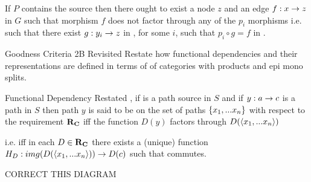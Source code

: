 \documentclass[xcolor=pst,dvips]{beamer}
\begin{document}
\begin{frame}
\IfSforproductepimonoCwithRCwords

 If $P$ contains the source  
then there ought to exist a node $z$ and an edge $f: x \rightarrow z$ in $G$ such that morphism $f$ does not factor through any of the $p_i$ morphisms 
i.e. such that there exist $g: y_i \rightarrow z$ in \catcw, for some $i$, such that $p_i\circ g = f$ in \catc. 
\end{frame}

\begin{frame}{Goodness Criteria 2B Revisited}
Restate how functional dependencies and their representations are defined in terms of  of categories with products and epi mono splits.
\end{frame}


\begin{frame}{Functional Dependency Restated}
\IfSforproductepimonoCwithRCwords, 
if  is a path source in $S$ and if
$y: a \rightarrow c$ is a path in $S$
then path $y$ is said to be  on the set of paths $\left\{x_1,...x_n\right\}$ with respect to the requirement $\textbf{R}_{\textbf{C}}$
iff the function $D(y)$ factors through $D(\langle x_1,... x_n \rangle)$

i.e. iff in each $D \in \textbf{R}_{\textbf{C}}$ there exists a  (unique)
function $H_D: img(D(\langle x_1,... x_n \rangle)) \rightarrow D(c)$ 
such that 
 commutes.
\end{frame}
\begin{frame} 
CORRECT THIS DIAGRAM
\end{frame}
\end{document}
